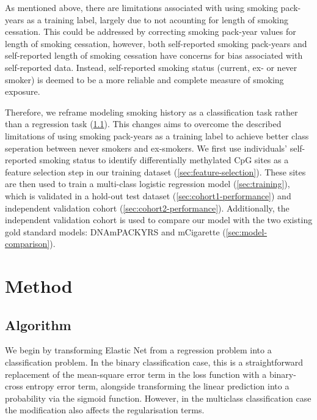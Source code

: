 \documentclass{article}
\begin{document}
As mentioned above, there are limitations associated with using smoking pack-years as a training label, largely due to not acounting for length of smoking cessation. This could be addressed by correcting smoking pack-year values for length of smoking cessation, however, both self-reported smoking pack-years and self-reported length of smoking cessation have concerns for bias associated with self-reported data. Instead, self-reported smoking status (current, ex- or never smoker) is deemed to be a more reliable and complete measure of smoking exposure.

Therefore, we reframe modeling smoking history as a classification task rather than a regression task (\ref{sec:algorithm}). This changes aims to overcome the described limitations of using smoking pack-years as a training label to achieve better class seperation between never smokers and ex-smokers. We first use individuals' self-reported smoking status to identify differentially methylated CpG sites as a feature selection step in our training dataset (\ref{sec:feature-selection}). These sites are then used to train a multi-class logistic regression model (\ref{sec:training}), which is validated in a hold-out test dataset (\ref{sec:cohort1-performance}) and independent validation cohort (\ref{sec:cohort2-performance}). Additionally, the independent validation cohort is used to compare our model with the two existing gold standard models: DNAmPACKYRS and mCigarette (\ref{sec:model-comparison}).

\section{Method}

\subsection{Algorithm} \label{sec:algorithm}
We begin by transforming Elastic Net from a regression problem into a classification problem. In the binary classification case, this is a straightforward replacement of the mean-square error term in the loss function with a binary-cross entropy error term, alongside transforming the linear prediction into a probability via the sigmoid function. However, in the multiclass classification case the modification also affects the regularisation terms.
\end{document}
